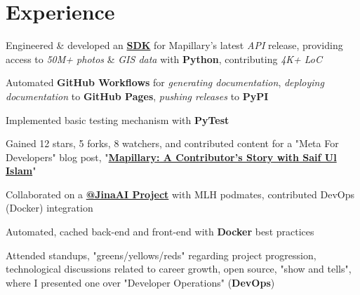 \documentclass[]{openfont}
\begin{document}
\begin{minipage}[t]{0.66\textwidth} 


\section{Experience}
\vspace{\topsep}
\begin{tightemize}
    \item Engineered \& developed an \textbf{\href{https://github.com/facebookincubator/mapillary-python-sdk}{SDK}} for Mapillary's latest \textit{API} release, providing access to \textit{50M+ photos} \& \textit{GIS data} with \textbf{Python}, contributing \textit{4K+ LoC}

    \item Automated \textbf{GitHub Workflows} for \textit{generating documentation}, \textit{deploying documentation} to \textbf{GitHub Pages}, \textit{pushing releases} to \textbf{PyPI}

    \item Implemented basic testing mechanism with \textbf{PyTest}

    \item Gained 12 stars, 5 forks, 8 watchers, and contributed content for a "Meta For Developers" blog post, "\href{https://developers.facebook.com/blog/post/2022/01/04/mapillary-contributor-story-saif-ul-islam/}{\textbf{Mapillary: A Contributor’s Story with Saif Ul Islam}}"
\end{tightemize}
\sectionsep

\begin{tightemize}
    \item Collaborated on a \href{https://github.com/georgeamccarthy/protein_search/pull/30}{\textbf{@JinaAI Project}} with MLH podmates, contributed DevOps (Docker) integration

    \item Automated, cached back-end and front-end with \textbf{Docker} best practices
\end{tightemize}
\sectionsep

\begin{tightemize}
    \item Attended standups, "greens/yellows/reds" regarding project progression, technological discussions related to career growth, open source, "show and tells", where I presented one over "Developer Operations" (\textbf{DevOps})


\end{tightemize}
\end{minipage}
\end{document}
